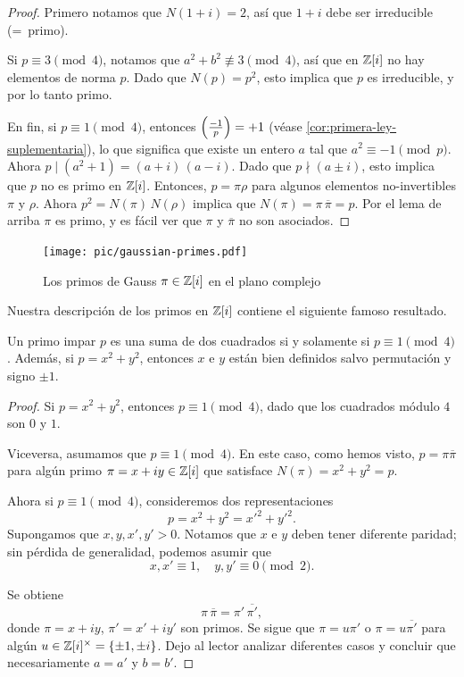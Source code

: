 \begin{proof}
  Primero notamos que $N (1+i) = 2$, así que $1 + i$ debe ser irreducible
  (=~primo).
 
  Si $p \equiv 3 \pmod{4}$, notamos que $a^2 + b^2 \not\equiv 3 \pmod{4}$, así
  que en $\mathbb{Z} [i]$ no hay elementos de norma $p$. Dado que $N (p) = p^2$, esto
  implica que $p$ es irreducible, y por lo tanto primo.

  En fin, si $p \equiv 1 \pmod{4}$, entonces $\left(\frac{-1}{p}\right) = +1$ (véase
  \ref{cor:primera-ley-suplementaria}), lo que significa que existe un entero
  $a$ tal que $a^2 \equiv -1 \pmod{p}$. Ahora
  $p \mid (a^2 + 1) = (a + i)\,(a - i)$. Dado que $p \nmid (a \pm i)$, esto
  implica que $p$ no es primo en $\mathbb{Z} [i]$. Entonces, $p = \pi\rho$ para algunos
  elementos no-invertibles $\pi$ y $\rho$.  Ahora $p^2 = N (\pi) \, N (\rho)$
  implica que $N (\pi) = \pi\,\overline{\pi} = p$. Por el lema de arriba $\pi$
  es primo, y es fácil ver que $\pi$ y $\overline{\pi}$ no son asociados.
\end{proof}

\begin{figure}
  \begin{center}
    \texttt{[image: pic/gaussian-primes.pdf]}
  \end{center}

  \caption{Los primos de Gauss $\pi \in \mathbb{Z} [i]$ en el plano complejo}
\end{figure}

Nuestra descripción de los primos en $\mathbb{Z} [i]$ contiene el siguiente famoso
resultado.

\begin{proposicion}[Fermat]
  Un primo impar $p$ es una suma de dos cuadrados si y solamente si
  $p \equiv 1 \pmod{4}$. Además, si $p = x^2 + y^2$, entonces $x$ e $y$ están
  bien definidos salvo permutación y signo $\pm 1$.

  \begin{proof}
    Si $p = x^2 + y^2$, entonces $p \equiv 1 \pmod{4}$, dado que los cuadrados
    módulo $4$ son $0$ y $1$.

    Viceversa, asumamos que $p \equiv 1 \pmod{4}$. En este caso, como hemos
    visto, $p = \pi \overline{\pi}$ para algún primo $\pi = x + iy \in \mathbb{Z} [i]$
    que satisface $N (\pi) = x^2 + y^2 = p$.

    Ahora si $p \equiv 1 \pmod{4}$, consideremos dos representaciones
    $$p = x^2 + y^2 = x'^2 + y'^2.$$
    Supongamos que $x,y,x',y' > 0$. Notamos que $x$ e $y$ deben tener diferente
    paridad; sin pérdida de generalidad, podemos asumir que
    $$x,x' \equiv 1, \quad y,y' \equiv 0 \pmod{2}.$$

    Se obtiene
    $$\pi\,\overline{\pi} = \pi'\,\overline{\pi'},$$
    donde $\pi = x + iy$, $\pi' = x' + iy'$ son primos. Se sigue que
    $\pi = u\pi'$ o $\pi = u\overline{\pi'}$ para algún
    $u \in \mathbb{Z} [i]^\times = \{ \pm 1, \pm i \}$. Dejo al lector analizar
    diferentes casos y concluir que necesariamente $a = a'$ y $b = b'$.
  \end{proof}
\end{proposicion}

